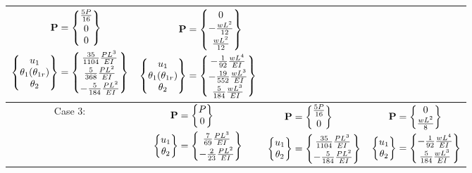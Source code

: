 \begin{example}
{\begin{longtable}{|c|c|c|c|}
  $\begin{aligned}\mathbf{P} &= \begin{Bmatrix}\frac{5P}{16}\\[2pt] 0\\ 0\end{Bmatrix}\\ \begin{Bmatrix}u_1\\ \theta_1(\theta_{1r})\\ \theta_2\end{Bmatrix} &= \begin{Bmatrix}\frac{35}{1104}\frac{PL^3}{EI}\\[2pt] \frac{5}{368}\frac{PL^2}{EI}\\[2pt] -\frac{5}{184}\frac{PL^2}{EI}\end{Bmatrix}\end{aligned}$ &
  $\begin{aligned}\mathbf{P} &= \begin{Bmatrix}0\\ -\frac{wL^2}{12}\\[2pt] \frac{wL^2}{12}\end{Bmatrix}\\ \begin{Bmatrix}u_1\\ \theta_1(\theta_{1r})\\ \theta_2\end{Bmatrix} &= \begin{Bmatrix}-\frac{1}{92}\frac{wL^4}{EI}\\[2pt] -\frac{19}{552}\frac{wL^3}{EI}\\[2pt] \frac{5}{184}\frac{wL^3}{EI}\end{Bmatrix}\end{aligned}$\\\hline
  \shortstack{Case 3:\\[2pt] } &
  $\begin{aligned}\mathbf{P} &= \begin{Bmatrix}P\\ 0\end{Bmatrix}\\ \begin{Bmatrix}u_1\\ \theta_2\end{Bmatrix} &= \begin{Bmatrix}\frac{7}{69}\frac{PL^3}{EI}\\[2pt] -\frac{2}{23}\frac{PL^2}{EI}\end{Bmatrix}\end{aligned}$ &
  $\begin{aligned}\mathbf{P} &= \begin{Bmatrix}\frac{5P}{16}\\[2pt] 0\end{Bmatrix}\\ \begin{Bmatrix}u_1\\ \theta_2\end{Bmatrix} &= \begin{Bmatrix}\frac{35}{1104}\frac{PL^3}{EI}\\[2pt] -\frac{5}{184}\frac{PL^2}{EI}\end{Bmatrix}\end{aligned}$ &
  $\begin{aligned}\mathbf{P} &= \begin{Bmatrix}0\\ \frac{wL^2}{8}\end{Bmatrix}\\ \begin{Bmatrix}u_1\\ \theta_2\end{Bmatrix} &= \begin{Bmatrix}-\frac{1}{92}\frac{wL^4}{EI}\\[2pt] \frac{5}{184}\frac{wL^3}{EI}\end{Bmatrix}\end{aligned}$\\\hline

\end{longtable}}
\end{example}
